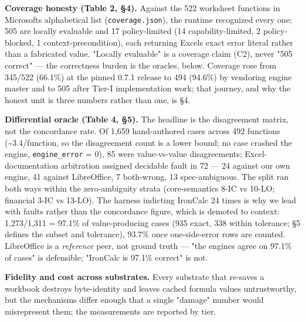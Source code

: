 \documentclass[
]{article}
\begin{document}
\textbf{Coverage honesty (Table 2, §4).} Against the 522 worksheet
functions in Microsoft\textquotesingle s alphabetical list
(\texttt{coverage.json}), the runtime recognized every one; 505 are
locally evaluable and 17 policy-limited (14 capability-limited, 2
policy-blocked, 1 context-precondition), each returning
Excel\textquotesingle s exact error literal rather than a fabricated
value. "Locally evaluable" is a coverage claim (C2), never "505 correct"
--- the correctness burden is the oracle\textquotesingle s, below.
Coverage rose from 345/522 (66.1\%) at the pinned 0.7.1 release to 494
(94.6\%) by vendoring engine master and to 505 after Tier-I
implementation work; that journey, and why the honest unit is three
numbers rather than one, is §4.

\textbf{Differential oracle (Table 4, §5).} The headline is the
disagreement matrix, not the concordance rate. Of 1,659 hand-authored
cases across 492 functions (\textasciitilde3.4/function, so the
disagreement count is a lower bound; no case crashed the engine,
\texttt{engine\_error} = 0), 85 were value-vs-value disagreements;
Excel-documentation arbitration assigned decidable fault in 72 --- 24
against our own engine, 41 against LibreOffice, 7 both-wrong, 13
spec-ambiguous. The split ran both ways within the zero-ambiguity strata
(core-semantics 8-IC vs 10-LO; financial 3-IC vs 13-LO). The harness
indicting IronCalc 24 times is why we lead with faults rather than the
concordance figure, which is demoted to context: 1,273/1,311 = 97.1\% of
value-producing cases (935 exact, 338 within tolerance; §5 defines the
subset and tolerance), 93.7\% once one-side-error rows are counted.
LibreOffice is a \emph{reference} peer, not ground truth --- "the
engines agree on 97.1\% of cases" is defensible; "IronCalc is 97.1\%
correct" is not.

\textbf{Fidelity and cost across substrates.} Every substrate that
re-saves a workbook destroys byte-identity and leaves cached formula
values untrustworthy, but the mechanisms differ enough that a single
"damage" number would misrepresent them; the measurements are reported
by tier.
\end{document}
